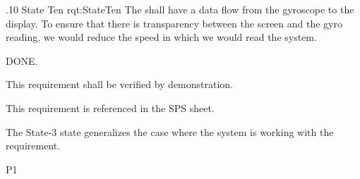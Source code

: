\ONERQMTV
{\RqtNumberBase.10}
{State Ten}
{rqt:StateTen}
{The \ThisSys shall have a data flow from the gyroscope to the display. To ensure that there is transparency between the screen and the gyro reading, we would reduce the speed in which we would read the system.}
{
	\item [Phase 1] DONE.

}
{This requirement shall be verified by demonstration.}
{
	\item [SPS] This requirement is referenced in the SPS sheet.
}
{
	\item The State-3 state generalizes the case where the system is working with the requirement.
}
{P1}

